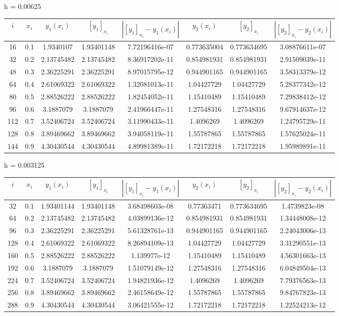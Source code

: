 \documentclass[11pt]{article}
\begin{document}
h = 0.00625 \\ 
\begin{tabular}{c | c c c c c c c}
$i$ & $x_i$ & $y_1(x_i)$ & $[y_1]_{x_i}$ & $|[y_1]_{x_i} - y_1(x_i)|$ & $y_2(x_i)$ & $[y_2]_{x_i}$ & $|[y_2]_{x_i} - y_2(x_i)|$ \\ \hline
16 & 0.1 & 1.9340107 & 1.93401148 & 7.72196416e-07 & 0.773635004 & 0.773634695 & 3.08876611e-07 \\
32 & 0.2 & 2.13745482 & 2.13745482 & 8.36917202e-11 & 0.854981931 & 0.854981931 & 2.91509039e-11 \\
48 & 0.3 & 2.36225291 & 2.36225291 & 8.97015795e-12 & 0.944901165 & 0.944901165 & 3.58313379e-12 \\
64 & 0.4 & 2.61069322 & 2.61069322 & 1.32081013e-11 & 1.04427729 & 1.04427729 & 5.28377342e-12 \\
80 & 0.5 & 2.88526222 & 2.88526222 & 1.82454052e-11 & 1.15410489 & 1.15410489 & 7.29838412e-12 \\
96 & 0.6 & 3.1887079 & 3.1887079 & 2.41966447e-11 & 1.27548316 & 1.27548316 & 9.67914637e-12 \\
112 & 0.7 & 3.52406724 & 3.52406724 & 3.11990433e-11 & 1.4096269 & 1.4096269 & 1.24795729e-11 \\
128 & 0.8 & 3.89469662 & 3.89469662 & 3.94058119e-11 & 1.55787865 & 1.55787865 & 1.57625024e-11 \\
144 & 0.9 & 4.30430544 & 4.30430544 & 4.89981389e-11 & 1.72172218 & 1.72172218 & 1.95989891e-11 \\
\end{tabular}

h = 0.003125 \\ 
\begin{tabular}{c | c c c c c c c}
$i$ & $x_i$ & $y_1(x_i)$ & $[y_1]_{x_i}$ & $|[y_1]_{x_i} - y_1(x_i)|$ & $y_2(x_i)$ & $[y_2]_{x_i}$ & $|[y_2]_{x_i} - y_2(x_i)|$ \\ \hline
32 & 0.1 & 1.93401144 & 1.93401148 & 3.68498603e-08 & 0.77363471 & 0.773634695 & 1.4739823e-08 \\
64 & 0.2 & 2.13745482 & 2.13745482 & 4.03899136e-12 & 0.854981931 & 0.854981931 & 1.34448008e-12 \\
96 & 0.3 & 2.36225291 & 2.36225291 & 5.61328761e-13 & 0.944901165 & 0.944901165 & 2.24043006e-13 \\
128 & 0.4 & 2.61069322 & 2.61069322 & 8.26894109e-13 & 1.04427729 & 1.04427729 & 3.31290551e-13 \\
160 & 0.5 & 2.88526222 & 2.88526222 & 1.139977e-12 & 1.15410489 & 1.15410489 & 4.56301663e-13 \\
192 & 0.6 & 3.1887079 & 3.1887079 & 1.51079149e-12 & 1.27548316 & 1.27548316 & 6.04849504e-13 \\
224 & 0.7 & 3.52406724 & 3.52406724 & 1.94821936e-12 & 1.4096269 & 1.4096269 & 7.79376563e-13 \\
256 & 0.8 & 3.89469662 & 3.89469662 & 2.46158649e-12 & 1.55787865 & 1.55787865 & 9.84767823e-13 \\
288 & 0.9 & 4.30430544 & 4.30430544 & 3.06421555e-12 & 1.72172218 & 1.72172218 & 1.22524213e-12 \\
\end{tabular}
\end{document}
